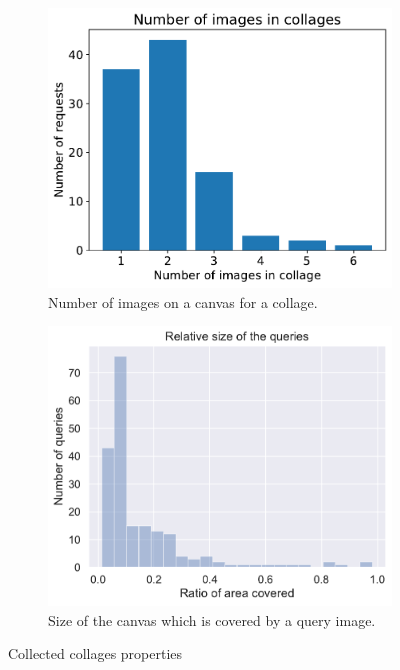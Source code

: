 \begin{figure}
     \centering
     \begin{subfigure}[b]{0.48\textwidth}
         \centering
         \includegraphics[width=\textwidth]{graphs/num_queries_in_request.pdf}
         \caption{Number of images on a canvas for a collage.}
         \label{fig:y equals x}
     \end{subfigure}
     \hfill
     \begin{subfigure}[b]{0.48\textwidth}
         \centering
         \includegraphics[width=\textwidth]{graphs/queries_size.pdf}
         \caption{Size of the canvas which is covered by a query image.}
         \label{fig:three sin x}
     \end{subfigure}
    
    \caption{Collected collages properties}
    \label{fig:annotated_dataset}
\end{figure}

